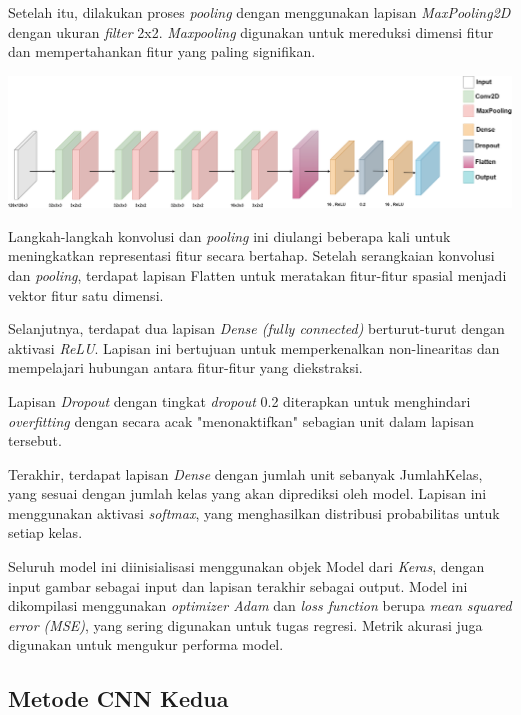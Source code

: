 Setelah itu, dilakukan proses \textit{pooling} dengan menggunakan lapisan \textit{MaxPooling2D} dengan ukuran \textit{filter} 2x2. \textit{Maxpooling} digunakan untuk mereduksi dimensi fitur dan mempertahankan fitur yang paling signifikan.

\begin{center}
	\includegraphics[width=1.0\linewidth]{gambar/bener/Arsitektur_CNN_Revisi.png}
	\label{fig:layerCNN}
\end{center}

Langkah-langkah konvolusi dan \textit{pooling} ini diulangi beberapa kali untuk meningkatkan representasi fitur secara bertahap. Setelah serangkaian konvolusi dan \textit{pooling}, terdapat lapisan Flatten untuk meratakan fitur-fitur spasial menjadi vektor fitur satu dimensi.

Selanjutnya, terdapat dua lapisan \textit{{Dense} (fully connected)} berturut-turut dengan aktivasi \textit{ReLU}. Lapisan ini bertujuan untuk memperkenalkan non-linearitas dan mempelajari hubungan antara fitur-fitur yang diekstraksi.

Lapisan \textit{Dropout} dengan tingkat \textit{dropout} 0.2 diterapkan untuk menghindari \textit{overfitting} dengan secara acak "menonaktifkan" sebagian unit dalam lapisan tersebut.

Terakhir, terdapat lapisan {\textit{Dense}} dengan jumlah unit sebanyak JumlahKelas, yang sesuai dengan jumlah kelas yang akan diprediksi oleh model. Lapisan ini menggunakan aktivasi \textit{softmax}, yang menghasilkan distribusi probabilitas untuk setiap kelas.

Seluruh model ini diinisialisasi menggunakan objek Model dari \textit{Keras}, dengan input gambar sebagai input dan lapisan terakhir sebagai output. Model ini dikompilasi menggunakan \textit{optimizer Adam} dan \textit{loss function} berupa \textit{mean squared error (MSE)}, yang sering digunakan untuk tugas regresi. Metrik akurasi juga digunakan untuk mengukur performa model.

\subsection{Metode CNN Kedua}

